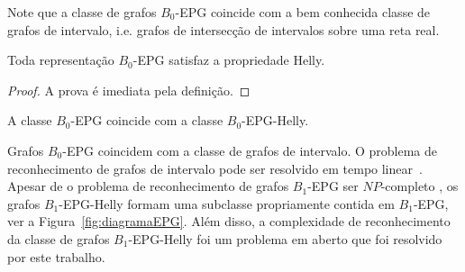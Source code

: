 Note que a classe de grafos $B_0$-EPG coincide com a bem conhecida classe de grafos de intervalo, i.e. grafos de intersecção de intervalos sobre uma reta real. 


\begin {lema} \label{lem:b0epg}
Toda representação $ B_0$-EPG satisfaz a propriedade Helly.
\end {lema}
\begin{proof}
A prova é imediata pela definição.
\end{proof}


\begin{corollary}
A classe $B_0$-EPG coincide com a classe $B_0$-EPG-Helly.
\end{corollary}

Grafos $B_0$-EPG coincidem com a classe de grafos de intervalo. O problema de reconhecimento de grafos de intervalo pode ser resolvido em tempo linear~\cite{booth1976}. Apesar de o problema de reconhecimento de grafos $ B_1$-EPG ser $NP$-completo \cite {heldt2014}, os grafos $ B_1$-EPG-Helly formam uma subclasse propriamente contida em $ B_1$-EPG, ver a Figura~\ref{fig:diagramaEPG}. Além disso, a complexidade de reconhecimento da classe de grafos $ B_1$-EPG-Helly foi um problema em aberto que foi resolvido por este trabalho. 

